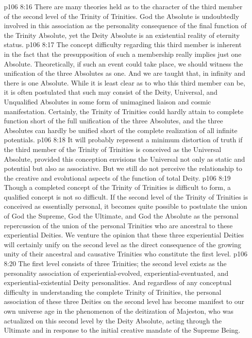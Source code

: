 \vs p106 8:16 \pc {}\bibnobreakspace {} There are many theories held as to the character of the third member of the second level of the Trinity of Trinities. God the Absolute is undoubtedly involved in this association as the personality consequence of the final function of the Trinity Absolute, yet the Deity Absolute is an existential reality of eternity status.
\vs p106 8:17 The concept difficulty regarding this third member is inherent in the fact that the presupposition of such a membership really implies just one Absolute. Theoretically, if such an event could take place, we should witness the  unification of the three Absolutes as one. And we are taught that, in infinity and  there is one Absolute. While it is least clear as to who this third member can be, it is often postulated that such may consist of the Deity, Universal, and Unqualified Absolutes in some form of unimagined liaison and cosmic manifestation. Certainly, the Trinity of Trinities could hardly attain to complete function short of the full unification of the three Absolutes, and the three Absolutes can hardly be unified short of the complete realization of all infinite potentials.
\vs p106 8:18 It will probably represent a minimum distortion of truth if the third member of the Trinity of Trinities is conceived as the Universal Absolute, provided this conception envisions the Universal not only as static and potential but also as associative. But we still do not perceive the relationship to the creative and evolutional aspects of the function of total Deity.
\vs p106 8:19 Though a completed concept of the Trinity of Trinities is difficult to form, a qualified concept is not so difficult. If the second level of the Trinity of Trinities is conceived as essentially personal, it becomes quite possible to postulate the union of God the Supreme, God the Ultimate, and God the Absolute as the personal repercussion of the union of the personal Trinities who are ancestral to these experiential Deities. We venture the opinion that these three experiential Deities will certainly unify on the second level as the direct consequence of the growing unity of their ancestral and causative Trinities who constitute the first level.
\vs p106 8:20 The first level consists of three Trinities; the second level exists as the personality association of experiential\hyp{}evolved, experiential\hyp{}eventuated, and experiential\hyp{}existential Deity personalities. And regardless of any conceptual difficulty in understanding the complete Trinity of Trinities, the personal association of these three Deities on the second level has become manifest to our own universe age in the phenomenon of the deitization of Majeston, who was actualized on this second level by the Deity Absolute, acting through the Ultimate and in response to the initial creative mandate of the Supreme Being.
